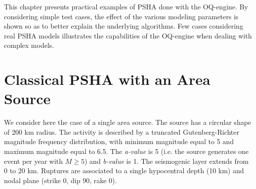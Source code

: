 This chapter presents practical examples of PSHA done with the OQ-engine. By considering simple test cases,
the effect of the various modeling parameters is shown so as to better explain the underlying algorithms. Few
cases considering real PSHA models illustrates the capabilities of the OQ-engine when dealing with complex
models.

\section{Classical PSHA with an Area Source}
We consider here the case of a single area source. The source has a circular shape of 200 km radius. The activity
is described by a truncated Gutenberg-Richter magnitude frequency distribution, with minimum magnitude
equal to 5 and maximum magnitude equal to 6.5. The \textit{a-value} is 5 (i.e. the source generates one
event per year with $M \ge 5$) and \textit{b-value} is 1. The seismogenic layer extends from 0 to 20 km.
Ruptures are associated to a single hypocentral depth (10 km) and nodal plane (strike 0, dip 90, rake 0).

